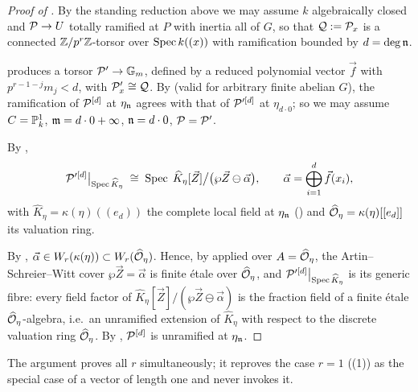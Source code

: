 \begin{proof}[Proof of ]
    By the standing reduction above we may assume $k$ algebraically closed and
    $\mathcal{P} \to U$ totally ramified at $P$ with inertia all of $G$, so that
    $\mathcal{Q} := \mathcal{P}_x$ is a connected $\mathbb{Z}/p^r\mathbb{Z}$-torsor over $\operatorname{Spec} k((x))$ with
    ramification bounded by $d = \deg \mathfrak{n}$.

     produces a torsor $\mathcal{P}' \to \mathbb{G}_m$, defined
    by a reduced polynomial vector $\vec f$ with $p^{r-1-j} m_j < d$, with
    $\mathcal{P}'_x \cong \mathcal{Q}$. By  (valid for arbitrary finite
    abelian $G$), the ramification of $\mathcal{P}^{[d]}$ at $\eta_{\mathfrak{n}}$ agrees with that of
    $\mathcal{P}'^{[d]}$ at $\eta_{d \cdot 0}$; so we may assume $C = \mathbb{P}^1_k$,
    $\mathfrak{m} = d \cdot 0 + \infty$, $\mathfrak{n} = d \cdot 0$, $\mathcal{P} = \mathcal{P}'$.

    By ,
    \[
    \mathcal{P}'^{[d]}\big|_{\operatorname{Spec} \widehat K_\eta}
    \;\cong\;
    \operatorname{Spec}\; \widehat K_\eta[\vec Z]\big/\bigl(\wp \vec Z \ominus \vec \alpha\bigr),
    \qquad
    \vec \alpha = \bigoplus_{i=1}^{d} \vec f(x_i),
    \]
    with $\widehat K_\eta = \kappa(\eta)((e_d))$ the complete local field at
    $\eta_{\mathfrak{n}}$ () and
    $\widehat{\mathcal{O}}_\eta = \kappa(\eta)[[e_d]]$ its valuation ring.

    By ,
    $\vec \alpha \in W_r(\kappa(\eta)) \subset W_r(\widehat{\mathcal{O}}_\eta)$. Hence, by
     applied over $A = \widehat{\mathcal{O}}_\eta$, the
    Artin--Schreier--Witt cover $\wp \vec Z = \vec \alpha$ is finite \'etale over
    $\widehat{\mathcal{O}}_\eta$, and $\mathcal{P}'^{[d]}\big|_{\operatorname{Spec} \widehat K_\eta}$ is its generic
    fibre: every field factor of
    $\widehat K_\eta[\vec Z]/(\wp \vec Z \ominus \vec \alpha)$ is the fraction field
    of a finite \'etale $\widehat{\mathcal{O}}_\eta$-algebra, i.e.\ an unramified extension of
    $\widehat K_\eta$ with respect to the discrete valuation ring
    $\widehat{\mathcal{O}}_\eta$. By ,
    $\mathcal{P}^{[d]}$ is unramified at $\eta_{\mathfrak{n}}$.
\end{proof}

\begin{rem*}
    The argument proves all $r$ simultaneously; it reproves the case $r=1$
    ((1)) as the special case of a
    vector of length one and never invokes it.
\end{rem*}


